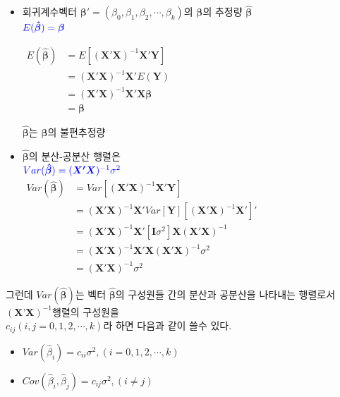 \documentclass[
]{article}
\providecommand{\tightlist}{%
  \setlength{\itemsep}{0pt}\setlength{\parskip}{0pt}}
\begin{document}
\begin{itemize}
\item
  회귀계수벡터
  \(\boldsymbol{\beta}'=(\beta_0,\beta_1,\beta_2,\cdots,\beta_k)\)의
  \(\boldsymbol{\beta}\)의 추정량 \(\boldsymbol{\hat{\beta}}\)\\
  \(\color{blue}{E(\boldsymbol{\hat{\beta}}) = \boldsymbol{\beta}}\)

  \(\begin{aligned} E(\boldsymbol{\hat{\beta}}) &= E[(\boldsymbol{X'X})^{-1}\boldsymbol{X'Y}] \\&=(\boldsymbol{X'X})^{-1}\boldsymbol{X'}E(\boldsymbol{Y}) \\&= (\boldsymbol{X'X})^{-1}\boldsymbol{X'X\beta} \\&=\boldsymbol{\beta} \end{aligned}\)

  \(\boldsymbol{\hat{\beta}}\)는 \(\boldsymbol{\beta}\)의 불편추정량
\item
  \(\boldsymbol{\hat{\beta}}\)의 분산-공분산 행렬은\\
  \(\color{blue} {Var(\boldsymbol{\hat{\beta}})= (\boldsymbol{X'X})^{-1}\sigma^2}\)\\
  \(\begin{aligned} Var(\boldsymbol{\hat{\beta}}) &=Var[(\boldsymbol{X'X})^{-1}\boldsymbol{X'Y}] \\&=(\boldsymbol{X'X})^{-1}\boldsymbol{X'}Var[\boldsymbol{Y}][(\boldsymbol{X'X})^{-1}\boldsymbol{X'}]' \\&=(\boldsymbol{X'X})^{-1}\boldsymbol{X'}[\boldsymbol{I}\sigma^2]\boldsymbol{X}(\boldsymbol{X'X})^{-1} \\&=(\boldsymbol{X'X})^{-1}\boldsymbol{X'}\boldsymbol{X}(\boldsymbol{X'X})^{-1}\sigma^2 \\&=(\boldsymbol{X'X})^{-1}\sigma^2 \end{aligned}\)
\end{itemize}

그런데 \(Var(\boldsymbol{\hat{\beta}})\)는 벡터
\(\boldsymbol{\hat{\beta}}\)의 구성원들 간의 분산과 공분산을 나타내는
행렬로서 \((\boldsymbol{X’X})^{-1}\)행렬의 구성원을\\
\(c_{ij}(i,j=0,1,2,\cdots, k)\)라 하면 다음과 같이 쓸수 있다.

\begin{itemize}
\tightlist
\item
  \(Var(\hat{\beta}_i)=c_{ii}\sigma^2, (i = 0, 1, 2, \cdots, k)\)
\item
  \(Cov(\hat{\beta}_i, \hat{\beta}_j)=c_{ij}\sigma^2, (i \ne j)\)
\end{itemize}
\end{document}
